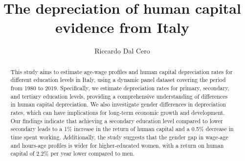 \documentclass[12pt]{article}
\title{The depreciation of human capital evidence from Italy }
\author{ Riccardo Dal Cero }
\begin{document}
\maketitle
\begin{abstract}

This study aims to estimate age-wage profiles and human capital depreciation rates for different education levels in Italy, using a dynamic panel dataset covering the period from 1980 to 2019. Specifically, we estimate depreciation rates for primary, secondary, and tertiary education levels, providing a comprehensive understanding of differences in human capital depreciation. We also investigate gender differences in depreciation rates, which can have implications for long-term economic growth and development. Our findings indicate that achieving a secondary education level compared to lower secondary leads to a 1\% increase in the return of human capital and a 0.5\% decrease in time spent working. Additionally, the study suggests that the gender gap in wage-age and hours-age profiles is wider for higher-educated women, with a return on human capital of 2.2\% per year lower compared to men.
\end{abstract}
\newpage
\end{document}
